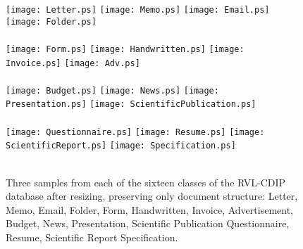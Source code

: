 \documentclass[10pt,conference,a4paper]{IEEEtran}
\begin{document}
\begin{figure*}[t]
\begin{center}
\texttt{[image: Letter.ps]}
		\hfill  \texttt{[image: Memo.ps]}
		\hfill  \texttt{[image: Email.ps]}
		\hfill  \texttt{[image: Folder.ps]}\\
		\hspace*{4cm}\hspace*{4cm}\hspace*{4cm}\\
		\vspace*{.25cm}
		\texttt{[image: Form.ps]}
		\hfill  \texttt{[image: Handwritten.ps]}
		\hfill  \texttt{[image: Invoice.ps]}
		\hfill  \texttt{[image: Adv.ps]}\\
		\hspace*{4cm}\hspace*{4cm}\hspace*{4cm}\\
		\vspace*{.25cm}
		\texttt{[image: Budget.ps]}
		\hfill  \texttt{[image: News.ps]}
		\hfill  \texttt{[image: Presentation.ps]}
		\hfill  \texttt{[image: ScientificPublication.ps]}\\
		\hspace*{4cm}\hspace*{4cm}\hspace*{4cm}\\
		\vspace*{.25cm}
		\texttt{[image: Questionnaire.ps]}
		\hfill  \texttt{[image: Resume.ps]}
		\hfill  \texttt{[image: ScientificReport.ps]}
		\hfill  \texttt{[image: Specification.ps]}\\
		\hspace*{4cm}\hspace*{4cm}\hspace*{4cm}\\
\caption{Three samples from each of the sixteen classes of the RVL-CDIP database after resizing, preserving only document structure:  Letter,  Memo,  Email,  Folder,  Form,  Handwritten,  Invoice,  Advertisement,  Budget,  News,  Presentation,  Scientific Publication  Questionnaire,  Resume,  Scientific Report  Specification.} \label{fig:datasheet}
	\end{center}
	\vspace*{-3mm}
\end{figure*}
\end{document}
